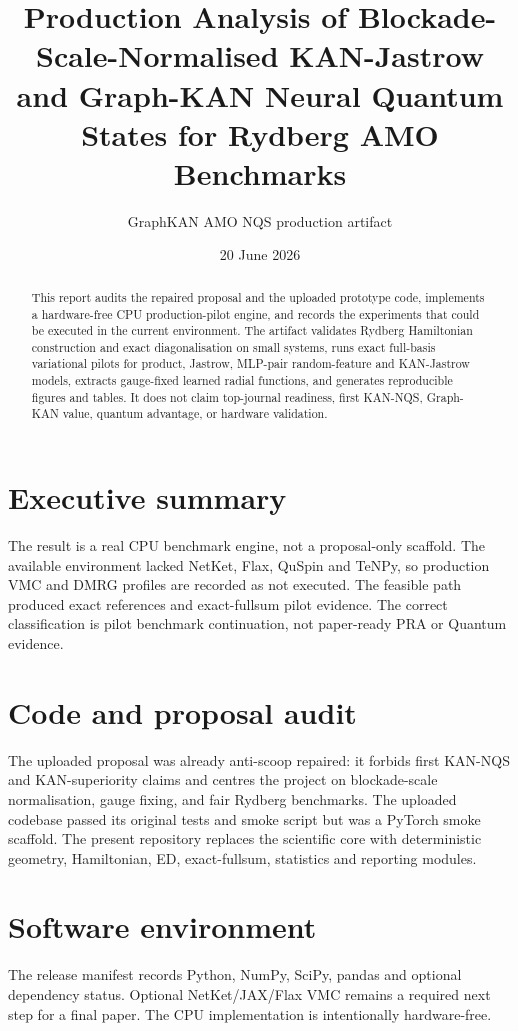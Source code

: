 \documentclass[11pt]{article}
\title{Production Analysis of Blockade-Scale-Normalised KAN-Jastrow and Graph-KAN Neural Quantum States for Rydberg AMO Benchmarks}
\author{GraphKAN AMO NQS production artifact}
\date{20 June 2026}
\begin{document}
\maketitle
\begin{abstract}
This report audits the repaired proposal and the uploaded prototype code, implements a hardware-free CPU production-pilot engine, and records the experiments that could be executed in the current environment. The artifact validates Rydberg Hamiltonian construction and exact diagonalisation on small systems, runs exact full-basis variational pilots for product, Jastrow, MLP-pair random-feature and KAN-Jastrow models, extracts gauge-fixed learned radial functions, and generates reproducible figures and tables. It does not claim top-journal readiness, first KAN-NQS, Graph-KAN value, quantum advantage, or hardware validation.
\end{abstract}

\section{Executive summary}
The result is a real CPU benchmark engine, not a proposal-only scaffold. The available environment lacked NetKet, Flax, QuSpin and TeNPy, so production VMC and DMRG profiles are recorded as not executed. The feasible path produced exact references and exact-fullsum pilot evidence. The correct classification is pilot benchmark continuation, not paper-ready PRA or Quantum evidence.

\section{Code and proposal audit}
The uploaded proposal was already anti-scoop repaired: it forbids first KAN-NQS and KAN-superiority claims and centres the project on blockade-scale normalisation, gauge fixing, and fair Rydberg benchmarks. The uploaded codebase passed its original tests and smoke script but was a PyTorch smoke scaffold. The present repository replaces the scientific core with deterministic geometry, Hamiltonian, ED, exact-fullsum, statistics and reporting modules.

\section{Software environment}
The release manifest records Python, NumPy, SciPy, pandas and optional dependency status. Optional NetKet/JAX/Flax VMC remains a required next step for a final paper. The CPU implementation is intentionally hardware-free.
\end{document}
